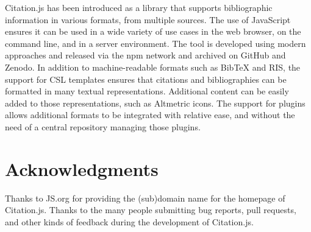 \documentclass[fleqn,10pt,lineno]{wlpeerj} %
\begin{document}
Citation.js has been introduced as a library that supports bibliographic information in various formats, from multiple sources. The use of JavaScript ensures it can be used in a wide variety of use cases in the web browser, on the command line, and in a server environment. The tool is developed using modern approaches and released via the npm network and archived on GitHub and Zenodo. In addition to machine-readable formats such as BibTeX and RIS, the support for CSL templates ensures that citations and bibliographies can be formatted in many textual representations. Additional content can be easily added to those representations, such as Altmetric icons. The support for plugins allows additional formats to be integrated with relative ease, and without the need of a central repository managing those plugins.

\section*{Acknowledgments}

Thanks to JS.org for providing the (sub)domain name for the homepage of Citation.js.
Thanks to the many people submitting bug reports, pull requests, and other kinds of feedback during the development of Citation.js.


\end{document}
